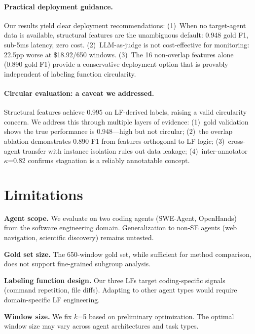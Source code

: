 \documentclass[11pt,a4paper]{article}
\begin{document}
\paragraph{Practical deployment guidance.}
Our results yield clear deployment recommendations:
(1)~When no target-agent data is available, structural features are the unambiguous default: 0.948 gold F1, sub-5ms latency, zero cost.
(2)~LLM-as-judge is not cost-effective for monitoring: 22.5pp worse at \$18.92/650 windows.
(3)~The 16 non-overlap features alone (0.890 gold F1) provide a conservative deployment option that is provably independent of labeling function circularity.

\paragraph{Circular evaluation: a caveat we addressed.}
Structural features achieve 0.995 on LF-derived labels, raising a valid circularity concern.
We address this through multiple layers of evidence: (1)~gold validation shows the true performance is 0.948---high but not circular; (2)~the overlap ablation demonstrates 0.890 F1 from features orthogonal to LF logic; (3)~cross-agent transfer with instance isolation rules out data leakage; (4)~inter-annotator $\kappa$=0.82 confirms stagnation is a reliably annotatable concept.

\section{Limitations}
\label{sec:limitations}

\textbf{Agent scope.} We evaluate on two coding agents (SWE-Agent, OpenHands) from the software engineering domain.
Generalization to non-SE agents (web navigation, scientific discovery) remains untested.

\textbf{Gold set size.} The 650-window gold set, while sufficient for method comparison, does not support fine-grained subgroup analysis.

\textbf{Labeling function design.} Our three LFs target coding-specific signals (command repetition, file diffs).
Adapting to other agent types would require domain-specific LF engineering.

\textbf{Window size.} We fix $k$=5 based on preliminary optimization.
The optimal window size may vary across agent architectures and task types.
\end{document}
